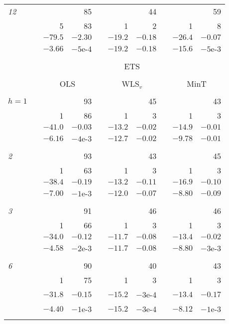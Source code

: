 \documentclass[11pt]{article}
\newcommand{\0}{\phantom{0}}
\begin{document}
\begin{table}[ht]
\begin{threeparttable}
\begin{tabular}{lrrrrrrrrr}
			{\it 12} & & & 85 & & & 44 & & & 59 \\
			& & 5 & 83 & & 1 & 2 & & 1 & 8 \\ 
			& & $-79.5$ & $-2.30$ & & $-19.2$ & $-0.18$ & & $-26.4$ & $-0.07$ \\
			& & $-3.66$ & $-5$e-4 & & $-19.2$ & $-0.18$ & & $-15.6$ & $-5$e-3 \\ 
			\cline{3-4} \cline{6-7} \cline{9-10} \\[-0.3cm]
			& & \multicolumn{8}{c}{ETS}\\
			\cline{3-10}\\[-0.3cm]
			& & \multicolumn{2}{c}{OLS} & & \multicolumn{2}{c}{WLS$_{v}$} & & \multicolumn{2}{c}{MinT} \\ 
			\cline{3-4} \cline{6-7} \cline{9-10} \\[-0.3cm]
			
			$h = 1$ & & & 93 & & & 45 & & & 43 \\
			& & 1 & 86 & & 1 & 3 & & 1 & 3 \\
			& & $-41.0$ & $-0.03$ & & $-13.2$ & $-0.02$ & & $-14.9$ & $-0.01$ \\
			& & $-6.16$ & $-4$e-3 & & $-12.7$ & $-0.02$ & & $-9.78$ & $-0.01$ \\\\[-0.3cm]
			
			{\it 2} & & & 93 & & & 43 & & & 45 \\
			& & 1 & 63 & & 1 & 3 & & 1 & 3 \\
			& & $-38.4$ & $-0.19$ & & $-13.2$ & $-0.11$ & & $-16.9$ & $-0.10$ \\
			& & $-7.00$ & $-1$e-3 & & $-12.0$ & $-0.07$ & & $-8.80$ & $-0.09$ \\\\[-0.3cm]
			
			{\it 3} & & & 91 & & & 46 & & & 46 \\
			& & 1 & 66 & & 1 & 3 & & 1 & 3 \\
			& & $-34.0$ & $-0.12$ & & $-11.7$ & $-0.08$ & & $-13.4$ & $-0.02$ \\
			& & $-4.58$ & $-2$e-3 & & $-11.7$ & $-0.08$ & & $-8.80$ & $-3$e-3 \\\\[-0.3cm]
			
			{\it 6} & & & 90 & & & 40 & & & 43 \\
			& & 1 & 75 & & 1 & 3 & & 1 & 3 \\
			& & $-31.8$ & $-0.15$ & & $-15.2$ & $-3$e-4 & & $-13.4$ & $-0.17$ \\
			& & $-4.40$ & $-1$e-3 & & $-15.2$ & $-3$e-4 & & $-8.12$ & $-1$e-3 \\\\[-0.3cm]
			

\end{tabular}
\end{threeparttable}
\end{table}
\end{document}
